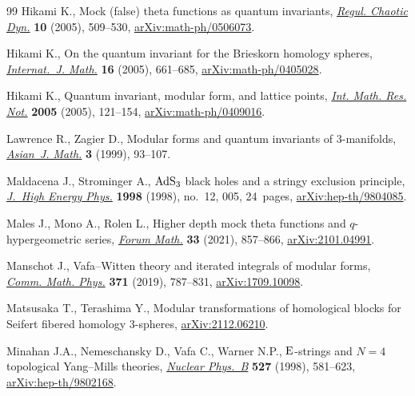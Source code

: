 \begin{thebibliography}{99}
Hikami K., Mock (false) theta functions as quantum invariants, \href{https://doi.org/10.1070/RD2005v010n04ABEH000328}{\textit{Regul.
 Chaotic Dyn.}} \textbf{10} (2005), 509--530, \href{https://arxiv.org/abs/math-ph/0506073}{arXiv:math-ph/0506073}.

Hikami K., On the quantum invariant for the {B}rieskorn homology spheres,
 \href{https://doi.org/10.1142/S0129167X05003004}{\textit{Internat.~J. Math.}} \textbf{16} (2005), 661--685,
 \href{https://arxiv.org/abs/math-ph/0405028}{arXiv:math-ph/0405028}.

Hikami K., Quantum invariant, modular form, and lattice points, \href{https://doi.org/10.1155/IMRN.2005.121}{\textit{Int.
 Math. Res. Not.}} \textbf{2005} (2005), 121--154, \href{https://arxiv.org/abs/math-ph/0409016}{arXiv:math-ph/0409016}.

Lawrence R., Zagier D., Modular forms and quantum invariants of
 {$3$}-manifolds, \href{https://doi.org/10.4310/AJM.1999.v3.n1.a5}{\textit{Asian~J. Math.}} \textbf{3} (1999), 93--107.

Maldacena J., Strominger A., {${\rm AdS}_3$} black holes and a stringy
 exclusion principle, \href{https://doi.org/10.1088/1126-6708/1998/12/005}{\textit{J.~High Energy Phys.}} \textbf{1998} (1998),
 no.~12, 005, 24~pages, \href{https://arxiv.org/abs/hep-th/9804085}{arXiv:hep-th/9804085}.

Males J., Mono A., Rolen L., Higher depth mock theta functions and
 {$q$}-hypergeometric series, \href{https://doi.org/10.1515/forum-2021-0013}{\textit{Forum Math.}} \textbf{33} (2021),
 857--866, \href{https://arxiv.org/abs/2101.04991}{arXiv:2101.04991}.

Manschot J., Vafa--{W}itten theory and iterated integrals of modular forms,
 \href{https://doi.org/10.1007/s00220-019-03389-5}{\textit{Comm. Math. Phys.}} \textbf{371} (2019), 787--831,
 \href{https://arxiv.org/abs/1709.10098}{arXiv:1709.10098}.

Matsusaka T., Terashima Y., Modular transformations of homological blocks for
 {S}eifert fibered homology $3$-spheres, \href{https://arxiv.org/abs/2112.06210}{arXiv:2112.06210}.

Minahan J.A., Nemeschansky D., Vafa C., Warner N.P., {${\rm E}$}-strings and
 {$N=4$} topological {Y}ang--{M}ills theories, \href{https://doi.org/10.1016/S0550-3213(98)00426-X}{\textit{Nuclear Phys.~B}}
 \textbf{527} (1998), 581--623, \href{https://arxiv.org/abs/hep-th/9802168}{arXiv:hep-th/9802168}.


\end{thebibliography}
